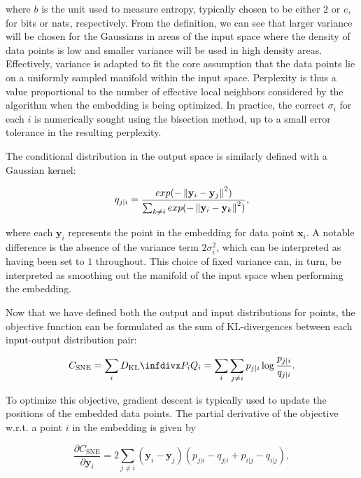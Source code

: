 where $b$ is the unit used to measure entropy, typically chosen to be either $2$ or $e$, for bits or nats, respectively. From the definition, we can see that larger variance will be chosen for the Gaussians in areas of the input space where the density of data points is low and smaller variance will be used in high density areas. Effectively, variance is adapted to fit the core assumption that the data points lie on a uniformly sampled manifold within the input space. Perplexity is thus a value proportional to the number of effective local neighbors considered by the algorithm when the embedding is being optimized. In practice, the correct $\sigma_i$ for each $i$ is numerically sought using the bisection method, up to a small error tolerance in the resulting perplexity.

The conditional distribution in the output space is similarly defined with a Gaussian kernel:

$$q_{j \vert i} = \frac{exp(-\left\lVert\mathbf{y}_i - \mathbf{y}_j\right\rVert^2)}{\sum_{k \neq i} exp(-\left\lVert\mathbf{y}_i - \mathbf{y}_k\right\rVert^2)},$$

where each $\mathbf{y}_i$ represents the point in the embedding for data point $\mathbf{x}_i$. A notable difference is the absence of the variance term $2 \sigma_i^2$, which can be interpreted as having been set to $1$ throughout. This choice of fixed variance can, in turn, be interpreted as smoothing out the manifold of the input space when performing the embedding.

Now that we have defined both the output and input distributions for points, the objective function can be formulated as the sum of KL-divergences between each input-output distribution pair:

\begin{equation}
C_{\text{SNE}} = \sum_i \dkl{P_i}{Q_i} = \sum_i \sum_{j \neq i} p_{j \vert i} \log \frac{p_{j \vert i}}{q_{j \vert i}}.
\label{eq:c_sne}
\end{equation}

To optimize this objective, gradient descent is typically used to update the positions of the embedded data points. The partial derivative of the objective w.r.t. a point $i$ in the embedding is given by

\begin{equation}
\frac{\partial C_{\text{SNE}}}{\partial \mathbf{y}_i} = 2 \sum_{j \neq i} (\mathbf{y}_i - \mathbf{y}_j)(p_{j \vert i} - q_{j \vert i} + p_{i \vert j} - q_{i \vert j}),
\label{eq:c_sne_grad}
\end{equation}


